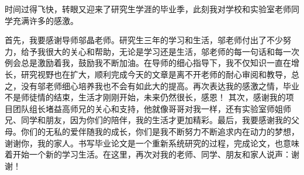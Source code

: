 \begin{thanks}

时间过得飞快，转眼又迎来了研究生学涯的毕业季，此刻我对学校和实验室老师同学充满许多的感激。

首先，我要感谢导师邬晶老师。研究生三年的学习和生活，邬老师付出了不少努力，给予我很大的关心和帮助，无论是学习还是生活，邬老师的每一句话和每一次例会总是激励着我，鼓励我不断加油。在导师的细心指导下，我不仅知识一直在增长，研究视野也在扩大，顺利完成今天的文章是离不开老师的耐心审阅和教导，总之，没有邬老师细心培养我也不会有如此大的提高。再次表达我的感激之情，毕业不是师徒情的结束，生活才刚刚开始，未来仍然很长，感恩！
其次，感谢我的项目团队组长堵益高师兄的关心和支持，他就像哥哥对我一样，还有实验室师姐师兄、同学和朋友，因为你们的陪伴，我的生活才更加精彩。最后，我要感谢我的父母。你们的无私的爱伴随我的成长，你们是我不断努力不断追求内在动力的梦想，谢谢你，我的家人。书写毕业论文是一个重新系统研究的过程，完成论文，也意味着开始一个新的学习生活。在这里，再次对我的老师、同学、朋友和家人说声：谢谢！

\end{thanks}
